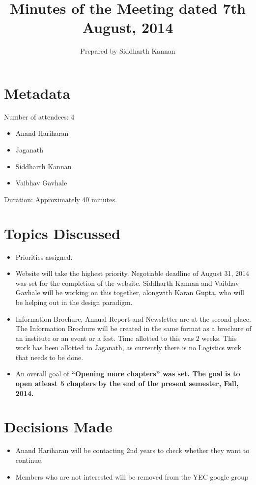 \documentclass[a4paper, 10pt]{article}
\title{Minutes of the Meeting dated 7th August, 2014}
\author{Prepared by Siddharth Kannan}
\begin{document}
\maketitle

\section{Metadata}

Number of attendees: 4

\begin{itemize}
\item{Anand Hariharan}
\item{Jaganath}
\item{Siddharth Kannan}
\item{Vaibhav Gavhale}
\end{itemize}

Duration: Approximately 40 minutes.

\section{Topics Discussed}

\begin{itemize}

\item{Priorities assigned.}

\item{Website will take the highest priority. Negotiable deadline of August 31, 2014 was set for the completion of the website. Siddharth Kannan and
Vaibhav Gavhale will be working on this together, alongwith Karan Gupta, who will be helping out in the design paradigm.}

\item{Information Brochure, Annual Report and Newsletter are at the second place. The Information Brochure will be created in the same format
as a brochure of an institute or an event or a fest. Time allotted to this was 2 weeks. This work has been allotted to Jaganath, as currently
there is no Logistics work that needs to be done.}

\item{An overall goal of \bf ``Opening more chapters'' \rm was set. The goal is to open atleast 5 chapters by the end of the present semester, Fall, 2014.}

\end{itemize}

\section{Decisions Made}

\begin{itemize}
\item{Anand Hariharan will be contacting 2nd years to check whether they want to continue.}
\item{Members who are not interested will be removed from the YEC google group}
\end{itemize}
\end{document}
